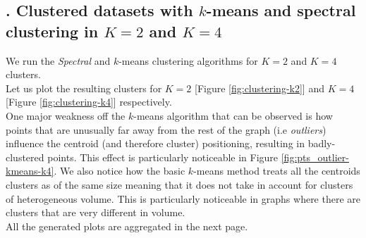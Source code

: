\documentclass[unicode,11pt,a4paper,oneside,numbers=endperiod,openany]{scrartcl}
\begin{document}
\subsection*{. Clustered datasets with $k$-means and spectral clustering in $K = 2$ and $K = 4$}
We run the \textit{Spectral} and $k$-means clustering algorithms for $K=2$ and $K=4$ clusters.\\
Let us plot the resulting clusters for $K=2$ [Figure \ref{fig:clustering-k2}] and $K=4$ [Figure \ref{fig:clustering-k4}] respectively.\\
One major weakness off the $k$-means algorithm that can be observed is how points that are unusually far away from the rest of the graph (i.e \textit{outliers}) influence the centroid (and therefore cluster) positioning, resulting in badly-clustered points. This effect is particularly noticeable in Figure \ref{fig:pts_outlier-kmeans-k4}. We also notice how the basic $k$-means method treats all the centroids clusters as of the same size meaning that it does not take in account for clusters of heterogeneous volume. This is particularly noticeable in graphs where there are clusters that are very different in volume.\\
All the generated plots are aggregated in the next page.
\clearpage
\end{document}
